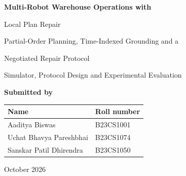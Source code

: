 \documentclass[10pt,a4paper]{article}
\begin{document}
\begin{titlepage}
\centering

\vspace*{1.6cm}
{\Large\bfseries Multi-Robot Warehouse Operations with\par
\vspace{2pt}
Local Plan Repair\par}

\vspace{0.7cm}
{\large Partial-Order Planning, Time-Indexed Grounding and a\par
\vspace{2pt}
Negotiated Repair Protocol\par}

\vspace{0.35cm}
{\large Simulator, Protocol Design and Experimental Evaluation\par}

\vspace{2.6cm}

{\large\bfseries Submitted by\par}
\vspace{0.6cm}
\renewcommand{\arraystretch}{1.5}
\begin{tabular}{ll}
\toprule
\textbf{Name} & \textbf{Roll number}\\
\midrule
Aaditya Biswas & B23CS1001\\
Uchat Bhavya Pareshbhai & B23CS1074\\
Sanskar Patil Dhirendra & B23CS1050\\
\bottomrule
\end{tabular}

\vfill
{\large October 2026\par}
\vspace{0.6cm}
\end{titlepage}
\end{document}
